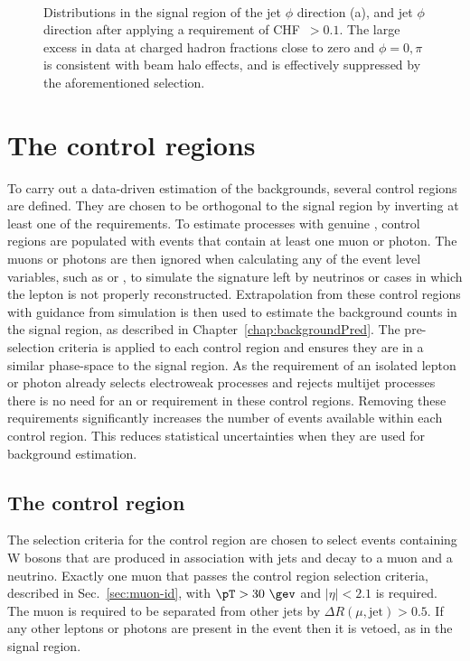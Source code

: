 \begin{figure}[!h]
{ } \\
  \caption{Distributions in the signal region of the jet $\phi$
  direction (a), and jet $\phi$ direction after applying a requirement
  of \ac{CHF}~$>0.1$. The large excess in data at charged hadron
  fractions close to zero and ${\phi = 0, \pi}$ is consistent with
  beam halo effects, and is effectively suppressed by the
  aforementioned selection.}
  \label{fig:leadJetCleaning}
\end{figure}

\section{The control regions}
\label{sec:controlregions}

To carry out a data-driven estimation of the \SM backgrounds, several
control regions are defined. They are chosen to be orthogonal to the
signal region by inverting at least one of the requirements. To estimate
processes with genuine \MET, control regions are populated with events
that contain at least one muon or photon. The muons or photons are then
ignored when calculating any of the event level variables, such as
\alphat or \bdphi, to simulate the signature left by neutrinos or
cases in which the lepton is not properly reconstructed. Extrapolation
from these control regions with guidance from simulation is then used
to estimate the background counts in the signal region, as described
in Chapter~\ref{chap:backgroundPred}. The pre-selection criteria
is applied to each control region and ensures they are in a similar
phase-space to the signal region. As the requirement of an isolated
lepton or photon already selects electroweak processes and rejects
\QCD multijet processes there is no need for an \alphat or \bdphi
requirement in these control regions. Removing these requirements
significantly increases the number of events available within each
control region. This reduces statistical uncertainties when they are
used for background estimation.

\subsection{The \mj control region}

The selection criteria for the \mj control region are chosen to select
events containing W bosons that are produced in association with
jets and decay to a muon and a neutrino. Exactly one muon that passes
the control region selection criteria, described in Sec.~\ref{sec:muon-id}, with
$\pT>30~\gev$ and $|\eta|<2.1$ is required. The muon is required to be
separated from other jets by $\Delta R(\mu,\mathrm{jet})>0.5$. If any
other leptons or photons are present in the event then it is vetoed, as
in the signal region.

